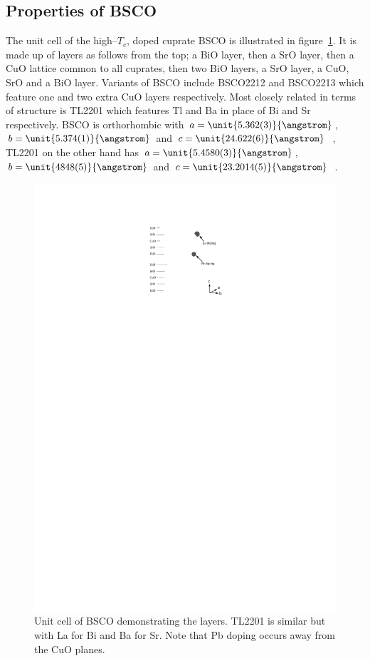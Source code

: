 
\subsection{Properties of \acs{BSCO}}

The unit cell of the high--$T_c$, doped cuprate \acf{BSCO} is illustrated in figure~\ref{Fig:Intro:BSCOUnitCell}. It is made up of layers as follows from the top; a BiO layer, then a SrO layer, then a CuO lattice common to all cuprates, then two BiO layers, a SrO layer, a CuO, SrO and a BiO layer. Variants of \acs{BSCO} include \ac{BSCO2212} and \ac{BSCO2213} which feature one and two extra CuO layers respectively. Most closely related in terms of structure is \acs{TL2201} which features Tl and Ba in place of Bi and Sr respectively. \ac{BSCO} is orthorhombic with $a=\unit{5.362(3)}{\angstrom}$, $b=\unit{5.374(1)}{\angstrom}$ and $c=\unit{24.622(6)}{\angstrom}$~\cite{Torardi1988}, \ac{TL2201} on the other hand has $a=\unit{5.4580(3)}{\angstrom}$, $b=\unit{4848(5)}{\angstrom}$ and $c=\unit{23.2014(5)}{\angstrom}$~\cite{Peets2007}.
\begin{figure}[htbp]
    \begin{center}
        \includegraphics[scale=1.1]{Chapter-Introduction/Figures/BSCOUnitCell/BSCOUnitCell}
        \caption{Unit cell of \acs{BSCO} demonstrating the layers. \ac{TL2201} is similar but with La for Bi and Ba for Sr. Note that Pb doping occurs away from the CuO planes.}
        \label{Fig:Intro:BSCOUnitCell}
    \end{center}
\end{figure}
